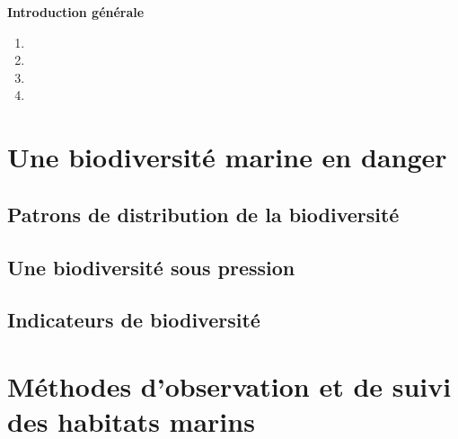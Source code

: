 
\centerline{\bfseries\textcolor{bleusection}{ \Huge Introduction générale}}  

\bigskip



{\LARGE
\begin{enumerate}[label=\textcolor{bleusection}{\arabic*}{.}, leftmargin=2cm]
  \item {}
  \item {}
  \item {}
  \item {}
\end{enumerate}
}

\clearpage
\pagestyle{intro}


\section{Une biodiversité marine en danger}\label{intro.1}
\subsection{Patrons de  distribution de la biodiversité}\label{intro.1.1}
\subsection{Une biodiversité sous pression}\label{intro.1.2}
\subsection{Indicateurs de biodiversité}\label{intro.1.3}

\newpage

\section{Méthodes d'observation et de suivi des habitats marins}\label{intro.2}
